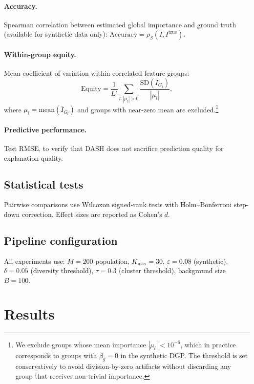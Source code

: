 \documentclass[11pt]{article}
\newcommand{\dash}{\textsc{DASH}}
\begin{document}
\paragraph{Accuracy.}
Spearman correlation between estimated global importance and ground truth
(available for synthetic data only):
$\text{Accuracy} = \rho_S(\bar{I}, I^{\text{true}})$.

\paragraph{Within-group equity.}
Mean coefficient of variation within correlated feature groups:
\begin{equation}
  \text{Equity} = \frac{1}{L'} \sum_{l : |\mu_l| > 0}
    \frac{\text{SD}(\bar{I}_{G_l})}{|\mu_l|},
\end{equation}
where $\mu_l = \text{mean}(\bar{I}_{G_l})$ and groups with near-zero
mean are excluded.\footnote{We exclude groups whose mean importance
$|\mu_l| < 10^{-6}$, which in practice corresponds to groups with
$\beta_g = 0$ in the synthetic DGP. The threshold is set conservatively
to avoid division-by-zero artifacts without discarding any group that
receives non-trivial importance.}

\paragraph{Predictive performance.}
Test RMSE, to verify that \dash{} does not sacrifice prediction quality
for explanation quality.

\subsection{Statistical tests}

Pairwise comparisons use Wilcoxon signed-rank tests with Holm--Bonferroni
step-down correction. Effect sizes are reported as Cohen's $d$.

\subsection{Pipeline configuration}

All experiments use: $M = 200$ population, $K_{\max} = 30$,
$\varepsilon = 0.08$ (synthetic), $\delta = 0.05$ (diversity threshold),
$\tau = 0.3$ (cluster threshold), background size $B = 100$.


\section{Results}
\label{sec:results}
\end{document}
